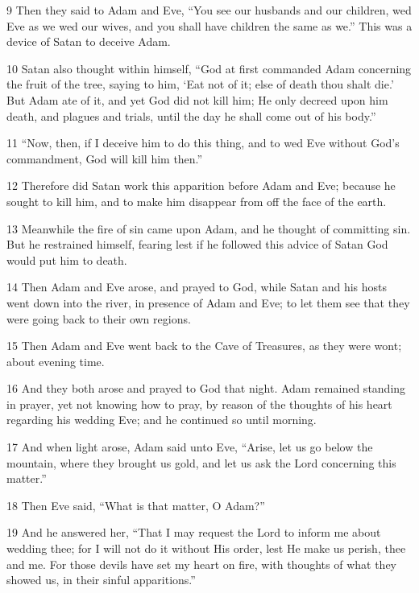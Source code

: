 \par 9 Then they said to Adam and Eve, “You see our husbands and our children, wed Eve as we wed our wives, and you shall have children the same as we.” This was a device of Satan to deceive Adam.

\par 10 Satan also thought within himself, “God at first commanded Adam concerning the fruit of the tree, saying to him, ‘Eat not of it; else of death thou shalt die.’ But Adam ate of it, and yet God did not kill him; He only decreed upon him death, and plagues and trials, until the day he shall come out of his body.”

\par 11 “Now, then, if I deceive him to do this thing, and to wed Eve without God's commandment, God will kill him then.”

\par 12 Therefore did Satan work this apparition before Adam and Eve; because he sought to kill him, and to make him disappear from off the face of the earth.

\par 13 Meanwhile the fire of sin came upon Adam, and he thought of committing sin. But he restrained himself, fearing lest if he followed this advice of Satan God would put him to death.

\par 14 Then Adam and Eve arose, and prayed to God, while Satan and his hosts went down into the river, in presence of Adam and Eve; to let them see that they were going back to their own regions.

\par 15 Then Adam and Eve went back to the Cave of Treasures, as they were wont; about evening time.

\par 16 And they both arose and prayed to God that night. Adam remained standing in prayer, yet not knowing how to pray, by reason of the thoughts of his heart regarding his wedding Eve; and he continued so until morning.

\par 17 And when light arose, Adam said unto Eve, “Arise, let us go below the mountain, where they brought us gold, and let us ask the Lord concerning this matter.”

\par 18 Then Eve said, “What is that matter, O Adam?”

\par 19 And he answered her, “That I may request the Lord to inform me about wedding thee; for I will not do it without His order, lest He make us perish, thee and me. For those devils have set my heart on fire, with thoughts of what they showed us, in their sinful apparitions.”

